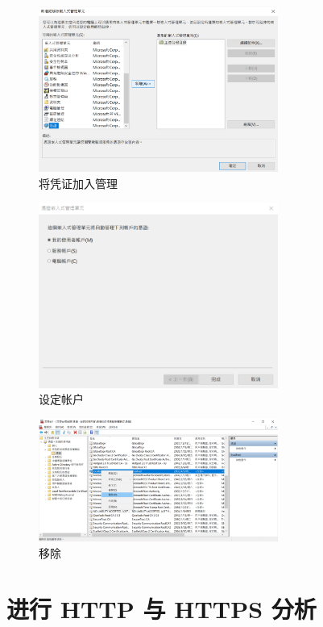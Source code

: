 \begin{figure}[htb]
\centering 
\includegraphics[width=0.70\textwidth]{img/ch1s3m3.png} 
\caption{将凭证加入管理}
\label{Test}
\end{figure}

\begin{figure}[htb]
\centering 
\includegraphics[width=0.70\textwidth]{img/ch1s3m4.png} 
\caption{设定帐户}
\label{Test}
\end{figure}

\begin{figure}[htb]
\centering 
\includegraphics[width=0.70\textwidth]{img/ch1s3m5.png} 
\caption{移除}
\label{Test}
\end{figure}

\section{进行 HTTP 与 HTTPS 分析}

